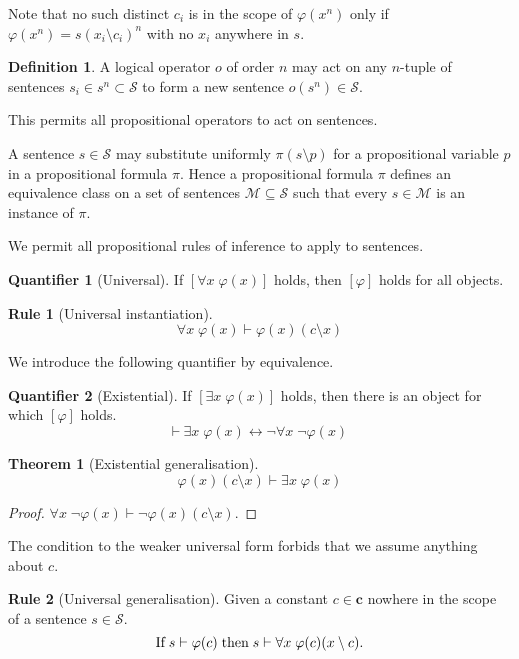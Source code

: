 \documentclass{amsbook}
\newcommand{\infers}{\mathrel\vdash}
\newcommand{\theorem}{\mathord\vdash\medspace}
\newcommand{\univ}[1]{\mathord\forall#1\;}
\newcommand{\exis}[1]{\mathord\exists#1\;}
\newcommand{\eqv}{\mathrel\leftrightarrow}
\theoremstyle{definition}
\newtheorem{frule}{Rule}[chapter]
\newtheorem{quant}{Quantifier}[chapter]
\newtheorem{thm}{Theorem}[section]
\newtheorem{dfn}{Definition}[section]
\begin{document}
Note that no such distinct $c_i$ is in the scope of $\varphi(x^n)$ only if $\varphi(x^n) = s(x_i \setminus c_i)^n$ with no $x_i$ anywhere in $s$.

\begin{dfn}
    A logical operator $o$ of order $n$ may act on any $n$-tuple of sentences $s_i \in s^n \subset \mathcal S$ to form a new sentence $o(s^n) \in \mathcal S$.
\end{dfn}

This permits all propositional operators to act on sentences.

A sentence $s \in \mathcal S$ may substitute uniformly $\pi(s \setminus p)$ for a propositional variable $p$ in a propositional formula $\pi$. Hence a propositional formula $\pi$ defines an equivalence class on a set of sentences $\mathcal M \subseteq \mathcal S$ such that every $s \in \mathcal M$ is an instance of $\pi$.

We permit all propositional rules of inference to apply to sentences.

\begin{quant}[Universal]
    If $\left[\univ x \varphi(x)\right]$ holds, then $[\varphi]$ holds for all objects.
\end{quant}

\begin{frule}[Universal instantiation]
    $$\univ x \varphi(x) \infers \varphi(x)(c \setminus x)$$
\end{frule}

We introduce the following quantifier by equivalence.

\begin{quant}[Existential]
    If $\left[\exis x \varphi(x)\right]$ holds, then there is an object for which $[\varphi]$ holds.
    $$\theorem \exis x \varphi(x) \eqv \neg\univ x \neg\varphi(x)$$
\end{quant}

\begin{thm}[Existential generalisation]
    $$\varphi(x)(c \setminus x) \infers \exis x \varphi(x)$$
    \begin{proof}
        $\univ x \neg\varphi(x) \infers \neg\varphi(x)(c \setminus x)$.
    \end{proof}
\end{thm}

The condition to the weaker universal form forbids that we assume anything about $c$.

\begin{frule}[Universal generalisation]
    Given a constant $c \in \mathbf c$ nowhere in the scope of a sentence $s \in \mathcal S$.
    $$\text{If\;} s \infers \varphi(c) \text{\;then\;} s \infers \univ x \varphi(c)(x \setminus c)\text.$$
\end{frule}
\end{document}

